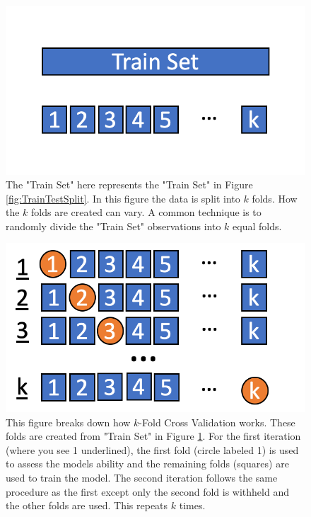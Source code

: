 \begin{figure}[!htb]
    \centering
      \centering
      \includegraphics[width=\textwidth]{figures/ppt/KFoldValidation.png}
    \caption{
	The "Train Set" here represents the "Train Set" in Figure \ref{fig:TrainTestSplit}. In this figure the data is split into \(k\) folds. How the \(k\) folds are created can vary. A common technique is to randomly divide the "Train Set" observations into \(k\) equal folds.
      }
     \label{fig:KFoldValidation}
  \end{figure}

\begin{figure}[!htb]
    \centering
      \centering
      \includegraphics[width=\textwidth]{figures/ppt/KFoldValidationExplain.png}
     
    
    \caption{
	This figure breaks down how \(k\)-Fold Cross Validation works. These folds are created from "Train Set" in Figure \ref{fig:KFoldValidation}. For the first iteration (where you see 1 underlined), the first fold (circle labeled 1) is used to assess the models ability and the remaining folds (squares) are used to train the model. The second iteration follows the same procedure as the first except only the second fold is withheld and the other folds are used. This repeats \(k\) times.
      }
\label{fig:KFoldValidationExplain}
  \end{figure}

